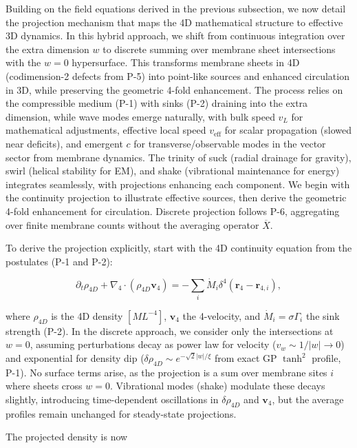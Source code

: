 Building on the field equations derived in the previous subsection, we now detail the projection mechanism that maps the 4D mathematical structure to effective 3D dynamics. In this hybrid approach, we shift from continuous integration over the extra dimension $w$ to discrete summing over membrane sheet intersections with the $w=0$ hypersurface. This transforms membrane sheets in 4D (codimension-2 defects from P-5) into point-like sources and enhanced circulation in 3D, while preserving the geometric 4-fold enhancement. The process relies on the compressible medium (P-1) with sinks (P-2) draining into the extra dimension, while wave modes emerge naturally, with bulk speed $v_L$ for mathematical adjustments, effective local speed $v_{\text{eff}}$ for scalar propagation (slowed near deficits), and emergent $c$ for transverse/observable modes in the vector sector from membrane dynamics. The trinity of suck (radial drainage for gravity), swirl (helical stability for EM), and shake (vibrational maintenance for energy) integrates seamlessly, with projections enhancing each component. We begin with the continuity projection to illustrate effective sources, then derive the geometric 4-fold enhancement for circulation. Discrete projection follows P-6, aggregating over finite membrane counts without the averaging operator $\overline{X}$.

To derive the projection explicitly, start with the 4D continuity equation from the postulates (P-1 and P-2):

\begin{equation}
\partial_t \rho_{4D} + \nabla_4 \cdot (\rho_{4D} \mathbf{v}_4) = -\sum_i \dot{M}_i \delta^4(\mathbf{r}_4 - \mathbf{r}_{4,i}),
\end{equation}

where $\rho_{4D}$ is the 4D density $[M L^{-4}]$, $\mathbf{v}_4$ the 4-velocity, and $\dot{M}_i = \sigma \Gamma_i$ the sink strength (P-2). In the discrete approach, we consider only the intersections at $w=0$, assuming perturbations decay as power law for velocity ($v_w \sim 1/|w| \to 0$) and exponential for density dip ($\delta \rho_{4D} \sim e^{-\sqrt{2} |w|/\xi}$ from exact GP $\tanh^2$ profile, P-1). No surface terms arise, as the projection is a sum over membrane sites $i$ where sheets cross $w=0$. Vibrational modes (shake) modulate these decays slightly, introducing time-dependent oscillations in $\delta \rho_{4D}$ and $\mathbf{v}_4$, but the average profiles remain unchanged for steady-state projections.

The projected density is now

